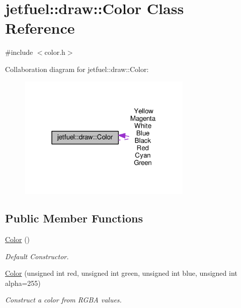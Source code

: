 \hypertarget{classjetfuel_1_1draw_1_1Color}{}\section{jetfuel\+:\+:draw\+:\+:Color Class Reference}
\label{classjetfuel_1_1draw_1_1Color}


{\ttfamily \#include $<$color.\+h$>$}



Collaboration diagram for jetfuel\+:\+:draw\+:\+:Color\+:\nopagebreak
\begin{figure}[H]
\begin{center}
\leavevmode
\includegraphics[width=235pt]{classjetfuel_1_1draw_1_1Color__coll__graph}
\end{center}
\end{figure}
\subsection*{Public Member Functions}
\begin{DoxyCompactItemize}
\item 
\hyperlink{classjetfuel_1_1draw_1_1Color_a0deb50ab0c45f96bf039d595fda8d6c3}{Color} ()
\begin{DoxyCompactList}\small\item\em Default Constructor. \end{DoxyCompactList}\item 
\hyperlink{classjetfuel_1_1draw_1_1Color_a4fadffbafbdae0386fc71cf7626dc988}{Color} (unsigned int red, unsigned int green, unsigned int blue, unsigned int alpha=255)
\begin{DoxyCompactList}\small\item\em Construct a color from R\+G\+BA values. \end{DoxyCompactList}\end{DoxyCompactItemize}
